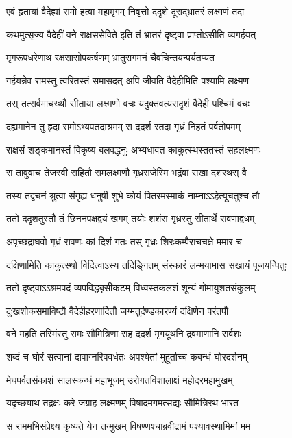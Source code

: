 \twolineshloka
{एवं हृतायां वैदेह्यां रामो हत्वा महामृगम्}
{निवृत्तो ददृशे दूराद्भ्रातरं लक्ष्मणं तदा}


\twolineshloka
{कथमुत्सृज्य वैदेहीं वने राक्षससेविते}
{इति तं भ्रातरं दृष्ट्वा प्राप्तोऽसीति व्यगर्हयत्}


\twolineshloka
{मृगरूपधरेणाथ रक्षसासोपकर्षणम्}
{भ्रातुरागमनं चैवचिन्तयन्पर्यतप्यत}


\twolineshloka
{गर्हयन्नेव रामस्तु त्वरितस्तं समासदत्}
{अपि जीवति वैदेहीमिति पश्यामि लक्ष्मण}


\twolineshloka
{तस् तत्सर्वमाचख्यौ सीताया लक्ष्मणो वचः}
{यदुक्तवत्यसदृशं वैदेही पश्चिमं वचः}


\twolineshloka
{दह्यमानेन तु हृदा रामोऽभ्यपतदाश्रमम्}
{स ददर्श रतदा गृध्रं निहतं पर्वतोपमम्}


\twolineshloka
{राक्षसं शङ्कमानस्तं विकृष्य बलवद्धनुः}
{अभ्यधावत काकुत्स्थस्ततस्तं सहलक्ष्मणः}


\twolineshloka
{स तावुवाच तेजस्वी सहितौ रामलक्ष्मणौ}
{गृध्रराजेस्मि भद्रंवां सखा दशरथस् वै}


\twolineshloka
{तस्य तद्वचनं श्रुत्वा संगृह्य धनुषी शुभे}
{कोयं पितरमस्माकं नाम्नाऽऽहेत्यूचतुश्च तौ}


\twolineshloka
{ततो ददृशतुस्तौ तं छिननपक्षद्वयं खगम्}
{तयोः शशंस गृध्रस्तु सीतार्थे रावणाद्वधम्}


\twolineshloka
{अपृच्छद्राघवो गृध्रं रावणः कां दिशं गतः}
{तस् गृध्रः शिरःकम्पैराचचक्षे ममार च}


\twolineshloka
{दक्षिणामिति काकुत्स्थो विदित्वाऽस्य तदिङ्गितम्}
{संस्कारं लम्भयामास सखायं पूजयन्पितुः}


\twolineshloka
{ततो दृष्ट्वाऽऽश्रमपदं व्यपविद्धबृसीकटम्}
{विध्वस्तकलशं शून्यं गोमायुशतसंकुलम्}


\twolineshloka
{दुःखशोकसमाविष्टौ वैदेहीहरणार्दितौ}
{जग्मतुर्दण्डकारण्यं दक्षिणेन परंतपौ}


\twolineshloka
{वने महति तस्मिंस्तु रामः सौमित्रिणा सह}
{ददर्श मृगयूथनि द्रवमाणानि सर्वशः}


\twolineshloka
{शब्दं च घोरं सत्वानां दावाग्नरिववर्धतः}
{अपश्येतां मुहूर्ताच्च कबन्धं घोरदर्शनम्}


\twolineshloka
{मेघपर्वतसंकाशं सालस्कन्धं महाभूजम्}
{उरोगतविशालाक्षं महोदरमहामुखम्}


\twolineshloka
{यदृच्छयाथ तद्रक्षः करे जग्राह लक्ष्मणम्}
{विषादमगमत्सद्यः सौमित्रिरथ भारत}


\twolineshloka
{स राममभिसंप्रेक्ष्य कृष्यते येन तन्मुखम्}
{विषण्णश्चाब्रवीद्रामं पश्यावस्थामिमां मम}


